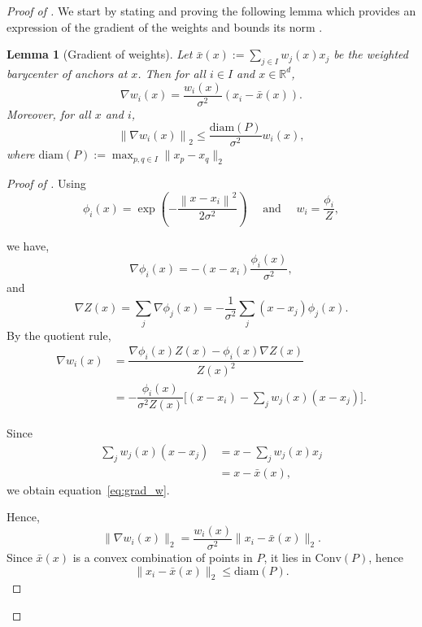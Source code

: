 \documentclass[10pt,a4paper]{amsart}
\newtheorem{lemma}{Lemma}
\newcommand{\R}{\mathbb{R}}
\newcommand{\diam}{\mathrm{diam}}
\def\eqref#1{equation~\ref{#1}}
\newcommand*{\norm}[1]{\left\|#1\right\|}
\begin{document}
\begin{proof}[Proof of ]

We start by stating and proving the following lemma which provides an expression of the gradient of the weights and bounds its norm .



\begin{lemma}[Gradient of weights]
\label{lem:grad_weights}
Let $\bar x(x):=\sum_{j \in I} w_j(x) x_j$ be the weighted barycenter of anchors at $x$.
Then for all $i \in I$ and $x \in \R^d$,
\begin{equation} \label{eq:grad_w}
    \nabla w_i(x) = \frac{w_i(x)}{\sigma^2} \left( x_i - \bar x(x) \right).
\end{equation}
Moreover, for all $x$ and $i$,
    \[ \norm{\nabla w_i(x)}_2 \le \frac{\diam(P)}{\sigma^2}w_i(x), \]
where $\diam(P) := \max_{p,q\in I}\|x_p - x_q\|_2$
\end{lemma} 

\begin{proof}[Proof of ]
Using 
    \[\phi_i(x) = \exp\left(- \dfrac{\norm{x - x_i}^2}{2 \sigma^2} \right) \quad \text{ and } \quad w_i= \dfrac{\phi_i}{Z}, \]

we have, 
    \[ \nabla\phi_i(x) = - ( x - x_i ) \frac{\phi_i(x)}{\sigma^2} , \] 
and
    \[\nabla Z(x) = \sum_j \nabla \phi_j(x) = - \dfrac{1}{\sigma^2}  \sum_j ( x -x_j ) \phi_j(x). \]
By the quotient rule,
\begin{align*}
   \nabla w_i(x)& =\dfrac{\nabla\phi_i(x) Z(x)-\phi_i(x)\nabla Z(x)}{Z(x)^2} \\ &= -\dfrac{\phi_i(x)}{\sigma^2 Z(x)}
\Big[(x-x_i)-\sum_j w_j(x)(x-x_j)\Big]. 
\end{align*}

Since 
\begin{align*}
    \sum_j w_j(x)(x-x_j) &= x-\sum_j w_j(x)x_j
    \\ &=x-\bar x(x),
\end{align*} 
we obtain \eqref{eq:grad_w}.


Hence, 
    \[ \|\nabla w_i(x)\|_2 = \dfrac{w_i(x)}{\sigma^2}\|x_i-\bar x(x)\|_2. \]
Since $\bar x(x)$ is a convex combination of points in $P$, it lies in $\mathrm{Conv}(P)$, hence 
    \[ \|x_i-\bar x(x)\|_2 \le \diam(P). \]

\end{proof}




\end{proof}
\end{document}
